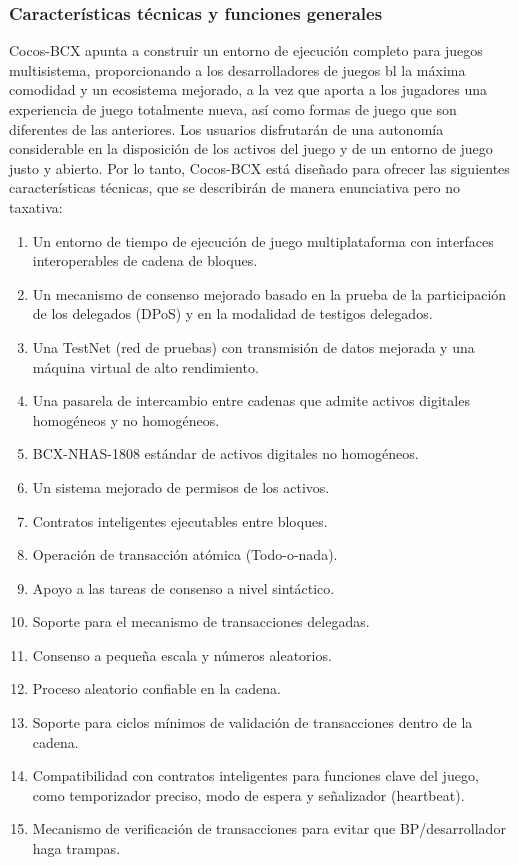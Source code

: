 \documentclass{article}
\begin{document}
\subsubsection{Características técnicas y funciones generales}
Cocos-BCX apunta a construir un entorno de ejecución completo para juegos multisistema, proporcionando a los desarrolladores de juegos bl la máxima comodidad y un ecosistema mejorado, a la vez que aporta a los jugadores una experiencia de juego totalmente nueva, así como formas de juego que son diferentes de las anteriores. Los usuarios disfrutarán de una autonomía considerable en la disposición de los activos del juego y de un entorno de juego justo y abierto.
Por lo tanto, Cocos-BCX está diseñado para ofrecer las siguientes características técnicas, que se describirán de manera enunciativa pero no taxativa:
\begin{enumerate}
    \item Un entorno de tiempo de ejecución de juego multiplataforma con interfaces interoperables de cadena de bloques.
    \item Un mecanismo de consenso mejorado basado en la prueba de la participación de los delegados (DPoS) y en la modalidad de testigos delegados.
    \item Una TestNet (red de pruebas) con transmisión de datos mejorada y una máquina virtual de alto rendimiento.
    \item Una pasarela de intercambio entre cadenas que admite activos digitales homogéneos y no homogéneos.
    \item BCX-NHAS-1808 estándar de activos digitales no homogéneos.
    \item Un sistema mejorado de permisos de los activos.
    \item Contratos inteligentes ejecutables entre bloques.
    \item Operación de transacción atómica (Todo-o-nada).
    \item Apoyo a las tareas de consenso a nivel sintáctico.
    \item Soporte para el mecanismo de transacciones delegadas.
    \item Consenso a pequeña escala y números aleatorios.
    \item Proceso aleatorio confiable en la cadena.
    \item Soporte para ciclos mínimos de validación de transacciones dentro de la cadena.
    \item Compatibilidad con contratos inteligentes para funciones clave del juego, como temporizador preciso, modo de espera y señalizador (heartbeat).
    \item Mecanismo de verificación de transacciones para evitar que BP/desarrollador haga trampas.
\end{enumerate}
\end{document}
